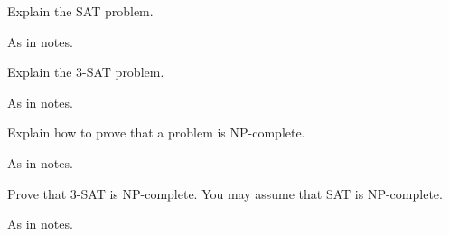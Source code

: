 \begin{questions}
\question
Explain the SAT problem.
\begin{solution}
As in notes.
\end{solution}

\question
Explain the 3-SAT problem.
\begin{solution}
As in notes.
\end{solution}

\question
Explain how to prove that a problem is NP-complete.
\begin{solution}
As in notes.
\end{solution}


\question
Prove that 3-SAT is NP-complete. You may assume that SAT is NP-complete.
\begin{solution}
As in notes.
\end{solution}

\end{questions}
